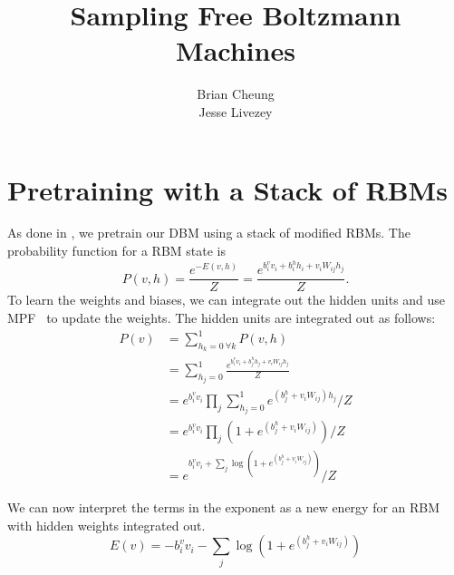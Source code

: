 \documentclass[11pt]{article}
\title{Sampling Free Boltzmann Machines}
\author{Brian Cheung\\
Jesse Livezey}
\begin{document}
\maketitle

\section{Pretraining with a Stack of RBMs}
As done in \cite{Salakhutdinov2009}, we pretrain our DBM using a stack of modified RBMs.
The probability function for a RBM state is
\begin{equation}
  \label{eq:Prbm}
  P(v,h)=\frac{e^{-E(v,h)}}{Z}=\frac{e^{b_i^vv_i+b_i^hh_i+v_iW_{ij}h_j}}{Z}.
\end{equation}
To learn the weights and biases, we can integrate out the hidden units and use MPF~\cite{Sohl-Dickstein2011} to update the weights.
The hidden units are integrated out as follows:
\begin{equation}
  \label{eq:intouth}
  \begin{split}
    P(v)&=\sum_{h_k=0~\forall k}^1P(v,h)\\
        &=\sum_{h_j=0}^1\frac{e^{b_i^vv_i+b_j^hh_j+v_iW_{ij}h_j}}{Z}\\
        &=e^{b_i^vv_i}\prod_j\sum_{h_j=0}^1e^{(b_j^h+v_iW_{ij})h_j}/Z\\
        &=e^{b_i^vv_i}\prod_j\left(1+e^{(b_j^h+v_iW_{ij})}\right)/Z\\
        &=e^{b_i^vv_i+\sum_j\log\left(1+e^{(b_j^h+v_iW_{ij})}\right)}/Z
  \end{split}
\end{equation}

We can now interpret the terms in the exponent as a new energy for an RBM with hidden weights integrated out.
\begin{equation}
  \label{eq:rbmE}
    E(v) = -b_i^vv_i-\sum_j\log\left(1+e^{(b_j^h+v_iW_{ij})}\right)
\end{equation}
\end{document}
